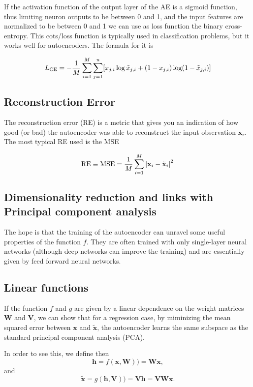 \documentclass[%
oneside,                 %
final,                   %
10pt]{article}
\begin{document}
If the activation function of the output layer of the AE is a sigmoid
function, thus limiting neuron outputs to be between 0 and 1, and the
input features are normalized to be between 0 and 1 we can use as loss
function the binary cross-entropy. This cots/loss function is
typically used in classification problems, but it works well for
autoencoders. The formula for it is

\[
L_{\textrm{CE}} = -\frac{1}{M}\sum_{i = 1}^{M}\sum_{j = 1}^{n}[x_{j,i} \log\tilde{x}_{j,i}+\left(1-x_{j,i}\right)\log (1-\tilde{x}_{j,i})] \\ 
\]

\subsection{Reconstruction Error}

The reconstruction error (RE) is a metric that gives you an indication of how good (or bad) the autoencoder was able to reconstruct
the input observation $\mathbf{x}_{i}$. The most typical RE used is the MSE

\[
\textrm{RE}\equiv \textrm{MSE} = \frac{1}{M}\sum_{i = 1}^{M}\left\vert\mathbf{x}_{i}-\tilde{\mathbf{x}}_{i}\right\vert^{2}\\ 
\]

\subsection{Dimensionality reduction and links with Principal component analysis}

The hope is that the training of the autoencoder can unravel some
useful properties of the function $f$. They are often trained with
only single-layer neural networks (although deep networks can improve
the training) and are essentially given by feed forward neural
networks.

\subsection{Linear functions}

If the function $f$ and $g$ are given by a linear dependence on the
weight matrices $\bm{W}$ and $\bm{V}$, we can show that for a
regression case, by miminizing the mean squared error between $\bm{x}$
and $\tilde{\bm{x}}$, the autoencoder learns the same subspace as the
standard principal component analysis (PCA).

In order to see this, we define then
\[
\bm{h} = f(\bm{x},\bm{W}))=\bm{W}\bm{x},
\]
and
\[
\tilde{\bm{x}} = g(\bm{h},\bm{V}))=\bm{V}\bm{h}=\bm{V}\bm{W}\bm{x}.
\]
\end{document}
